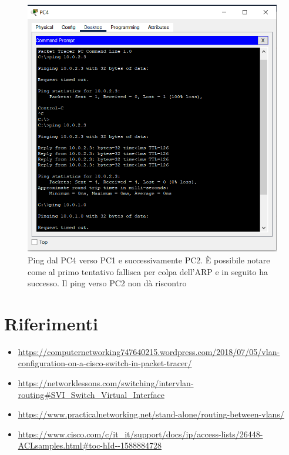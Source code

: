 \documentclass[a4paper,12pt]{report}
\begin{document}
\begin{figure}[H]
\includegraphics{pc4_ping.png}
\caption{Ping dal PC4 verso PC1 e successivamente PC2. È possibile notare come al primo tentativo fallisca per colpa dell'ARP e in seguito ha successo. Il ping verso PC2 non dà riscontro}
\label{fig:pc4_ping}
\end{figure}
\chapter{Riferimenti}
\begin{itemize}
    \item \url{https://computernetworking747640215.wordpress.com/2018/07/05/vlan-configuration-on-a-cisco-switch-in-packet-tracer/}
    \item \url{https://networklessons.com/switching/intervlan-routing#SVI_Switch_Virtual_Interface}
    \item \url{https://www.practicalnetworking.net/stand-alone/routing-between-vlans/}
    \item \url{https://www.cisco.com/c/it_it/support/docs/ip/access-lists/26448-ACLsamples.html#toc-hId--1588884728}
\end{itemize}
\end{document}
